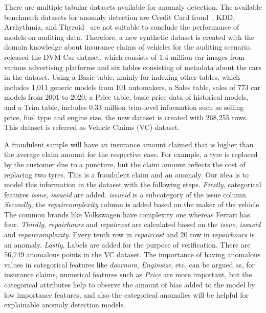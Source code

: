 \documentclass{article}
\begin{document}
There are multiple tabular datasets available for anomaly detection. The available benchmark datasets for anomaly detection are Credit Card fraud~\citep{creditcard}, KDD, Arrhythmia, and Thyroid~\citep{ucidata} are not suitable to conclude the performance of models on auditing data. Therefore, a new synthetic dataset is created with the domain knowledge about insurance claims of vehicles for the auditing scenario. \citep{DVI} released the DVM-Car dataset, which consists of 1.4 million car images from various advertising platforms and six tables consisting of metadata about the cars in the dataset. Using a Basic table, mainly for indexing other tables, which includes 1,011 generic models from 101 automakers, a Sales table, sales of 773 car models from 2001 to 2020, a Price table, basic price data of historical models, and a Trim table, includes 0.33 million trim-level information such as selling price, fuel type and engine size, the new dataset is created with 268,255 rows. This dataset is referred as Vehicle Claims (VC) dataset.

A fraudulent sample will have an insurance amount claimed that is higher than the average claim amount for the respective case. For example, a tyre is replaced by the customer due to a puncture, but the claim amount reflects the cost of replacing two tyres. This is a fraudulent claim and an anomaly. Our idea is to model this information in the dataset with the following steps. \textit{Firstly}, categorical features \textit{issue}, \textit{issueid} are added. \textit{issueid} is a subcategory of the issue column. \textit{Secondly}, the \textit{repaircomplexity}  column is added based on the maker of the vehicle. The common brands like Volkswagen have complexity one whereas Ferrari has four. \textit{Thirdly}, \textit{repairhours} and \textit{repaircost} are calculated based on the \textit{issue}, \textit{issueid} and \textit{repaircomplexity}. Every tenth row in \textit{repaircost} and 20 row in \textit{repairhours} is an anomaly. \textit{Lastly}, Labels are added for the purpose of verification. There are 56,749 anomalous points in the VC dataset. The importance of having anomalous values in categorical features like  \textit{doornum}, \textit{Enginsize}, etc. can be argued as, for insurance claims, numerical features such as \textit{Price} are more important, but the categorical attributes help to observe the amount of bias added to the model by low importance features, and also the categorical anomalies will be helpful for explainable anomaly detection models.
\end{document}
